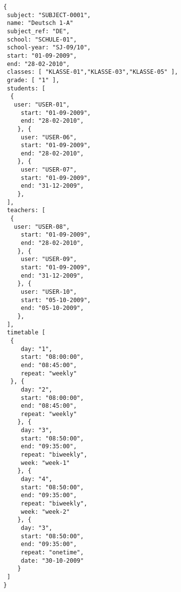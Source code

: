 
\begin{lstlisting}[caption={Beispiel eines Schulfachs},frame=tlrb]
{
 subject: "SUBJECT-0001",
 name: "Deutsch 1-A"
 subject_ref: "DE",
 school: "SCHULE-01",
 school-year: "SJ-09/10",
 start: "01-09-2009",
 end: "28-02-2010",
 classes: [ "KLASSE-01","KLASSE-03","KLASSE-05" ],
 grade: [ "1" ],
 students: [
  { 
   user: "USER-01",
	 start: "01-09-2009",
	 end: "28-02-2010",
	}, { 
	 user: "USER-06",
	 start: "01-09-2009",
	 end: "28-02-2010",
	}, { 
	 user: "USER-07",
	 start: "01-09-2009",
	 end: "31-12-2009",
	},
 ],
 teachers: [
  { 
   user: "USER-08",
	 start: "01-09-2009",
	 end: "28-02-2010",
	}, { 
	 user: "USER-09",
	 start: "01-09-2009",
	 end: "31-12-2009",
	}, { 
	 user: "USER-10",
	 start: "05-10-2009",
	 end: "05-10-2009",
	},
 ],
 timetable [
  {
	 day: "1",
	 start: "08:00:00",
	 end: "08:45:00",
	 repeat: "weekly"
  }, {
	 day: "2",
	 start: "08:00:00",
	 end: "08:45:00",
	 repeat: "weekly"
	}, {
	 day: "3",
	 start: "08:50:00",
	 end: "09:35:00",
	 repeat: "biweekly",
	 week: "week-1"
	}, {
	 day: "4",
	 start: "08:50:00",
	 end: "09:35:00",
	 repeat: "biweekly",
	 week: "week-2"
	}, {
	 day: "3",
	 start: "08:50:00",
	 end: "09:35:00",
	 repeat: "onetime",
	 date: "30-10-2009"
	}	 
 ]
}
\end{lstlisting}